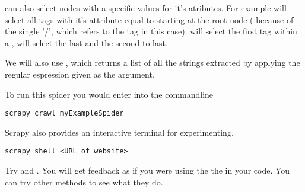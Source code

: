  can also select nodes with a specific values for it's atributes. 
For example  will select all  tags with it's  attribute equal to  starting at the root node ( because of the single '/', which refers to the  tag in this case). 
 will select the first  tag within a ,  will select the last and  the second to last.

We will also use , which returns a list of all the strings extracted by applying the regular espression given as the argument.

To run this spider you would enter into the commandline
\begin{lstlisting}
scrapy crawl myExampleSpider
\end{lstlisting}

Scrapy also provides an interactive terminal for experimenting.
\begin{lstlisting}
scrapy shell <URL of website>
\end{lstlisting}

Try  and . You will get feedback as if you were using the the  in your code. You can try other methods to see what they do.

\begin{comment}
\begin{problem}
Create a new project called \li{dmoz} and create a spider to scrape from the domain \url{dmoz.org} the two links \url{http://www.dmoz.org/Computers/Programming/Languages/Python/Books/} and \url{http://www.dmoz.org/Computers/Programming/Languages/Python/Resources/}. 
Use the same item class ( but you should rename it appropriately) and modify the \li{parse} function of the spider to produce items for each \li{li} in a \li{ul} tag. 
Store the text of each \li{a} tag in \li{item.title} and the actual link in \li{link}. 
Store the entire text of the \li{li} tag in \li{item.desc}. 
You can leave in the two lines that store the html source when you first run your script, but you should not include them in your final solution. 
Store the resulting items in a \li{.csv} file by running in the commandline \li{scrapy crawl yourSpider -o items.csv -t csv}.
\end{problem}
\end{comment}

